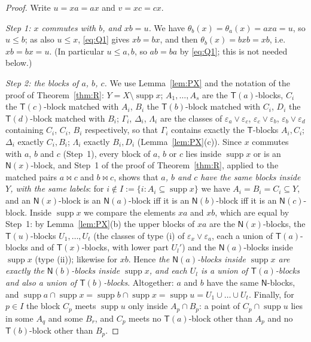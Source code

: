 \documentclass[11pt]{amsart}
\theoremstyle{definition}
\newcommand{\supp}{\operatorname{supp}}
\newcommand{\T}{\mathsf{T}}
\newcommand{\N}{\mathsf{N}}
\begin{document}
\begin{proof}
Write $u=xa=ax$ and $v=xc=cx$.

\smallskip
\emph{Step 1: $x$ commutes with $b$, and $xb=u$.} We have $\theta_b(x)=\theta_a(x)=axa=u$, so $u\le b$; as also $u\le x$, \eqref{eq:Q1} gives $xb=bx$, and then $\theta_b(x)=bxb=xb$, i.e.\ $xb=bx=u$. (In particular $u\le a,b$, so $ab=ba$ by \eqref{eq:Q1}; this is not needed below.)

\smallskip
\emph{Step 2: the blocks of $a$, $b$, $c$.} We use Lemma~\ref{lem:PX} and the notation of the proof of Theorem~\ref{thm:R}: $Y=X\setminus\supp x$; $A_1,\dots,A_s$ are the $\T(a)$-blocks, $C_i$ the $\T(c)$-block matched with $A_i$, $B_i$ the $\T(b)$-block matched with $C_i$, $D_i$ the $\T(d)$-block matched with $B_i$; $\Gamma_i$, $\Delta_i$, $\Lambda_i$ are the classes of $\varepsilon_a\vee\varepsilon_c$, $\varepsilon_c\vee\varepsilon_b$, $\varepsilon_b\vee\varepsilon_d$ containing $C_i$, $C_i$, $B_i$ respectively, so that $\Gamma_i$ contains exactly the $\T$-blocks $A_i,C_i$; $\Delta_i$ exactly $C_i,B_i$; $\Lambda_i$ exactly $B_i,D_i$ (Lemma~\ref{lem:PX}(c)). Since $x$ commutes with $a$, $b$ and $c$ (Step~1), every block of $a$, $b$ or $c$ lies inside $\supp x$ or is an $\N(x)$-block, and Step~1 of the proof of Theorem~\ref{thm:R}, applied to the matched pairs $a\bowtie c$ and $b\bowtie c$, shows that \emph{$a$, $b$ and $c$ have the same blocks inside $Y$, with the same labels}: for $i\notin I:=\{i:A_i\subseteq\supp x\}$ we have $A_i=B_i=C_i\subseteq Y$, and an $\N(x)$-block is an $\N(a)$-block iff it is an $\N(b)$-block iff it is an $\N(c)$-block. Inside $\supp x$ we compare the elements $xa$ and $xb$, which are equal by Step~1: by Lemma~\ref{lem:PX}(b) the upper blocks of $xa$ are the $\N(x)$-blocks, the $\T(u)$-blocks $U_1,\dots,U_t$ (the classes of type (i) of $\varepsilon_x\vee\varepsilon_a$, each a union of $\T(a)$-blocks and of $\T(x)$-blocks, with lower part $U_l'$) and the $\N(a)$-blocks inside $\supp x$ (type (ii)); likewise for $xb$. Hence \emph{the $\N(a)$-blocks inside $\supp x$ are exactly the $\N(b)$-blocks inside $\supp x$, and each $U_l$ is a union of $\T(a)$-blocks and also a union of $\T(b)$-blocks}. Altogether: $a$ and $b$ have the same $\N$-blocks, and $\supp a\cap\supp x=\supp b\cap\supp x=\supp u=U_1\cup\dots\cup U_t$. Finally, for $p\in I$ the block $C_p$ meets $\supp u$ only inside $A_p\cap B_p$: a point of $C_p\cap\supp u$ lies in some $A_q$ and some $B_r$, and $C_p$ meets no $\T(a)$-block other than $A_p$ and no $\T(b)$-block other than $B_p$.


\end{proof}
\end{document}

